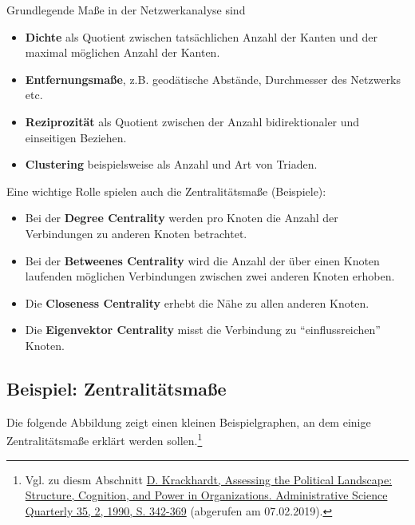 \documentclass[ngerman,]{scrreprt}
\providecommand{\tightlist}{%
  \setlength{\itemsep}{0pt}\setlength{\parskip}{0pt}}
\begin{document}
Grundlegende Maße in der Netzwerkanalyse sind

\begin{itemize}
\tightlist
\item
  \textbf{Dichte} als Quotient zwischen tatsächlichen Anzahl der Kanten und der maximal möglichen Anzahl der Kanten.
\item
  \textbf{Entfernungsmaße}, z.B. geodätische Abstände, Durchmesser des Netzwerks etc.
\item
  \textbf{Reziprozität} als Quotient zwischen der Anzahl bidirektionaler und einseitigen Beziehen.
\item
  \textbf{Clustering} beispielsweise als Anzahl und Art von Triaden.
\end{itemize}

Eine wichtige Rolle spielen auch die Zentralitätsmaße (Beispiele):

\begin{itemize}
\tightlist
\item
  Bei der \textbf{Degree Centrality} werden pro Knoten die Anzahl der Verbindungen zu anderen Knoten betrachtet.
\item
  Bei der \textbf{Betweenes Centrality} wird die Anzahl der über einen Knoten laufenden möglichen Verbindungen zwischen zwei anderen Knoten erhoben.
\item
  Die \textbf{Closeness Centrality} erhebt die Nähe zu allen anderen Knoten.
\item
  Die \textbf{Eigenvektor Centrality} misst die Verbindung zu ``einflussreichen'' Knoten.
\end{itemize}

\subsection{Beispiel: Zentralitätsmaße}\label{beispiel-zentralituxe4tsmauxdfe}

Die folgende Abbildung zeigt einen kleinen Beispielgraphen, an dem einige Zentralitätsmaße erklärt werden sollen.\footnote{Vgl. zu diesm Abschnitt \href{https://www.jstor.org/stable/2393394?origin=crossref\&seq=1\#metadata_info_tab_contents}{D. Krackhardt, Assessing the Political Landscape: Structure, Cognition, and Power in Organizations. Administrative Science Quarterly 35, 2, 1990, S. 342-369} (abgerufen am 07.02.2019).}
\end{document}
